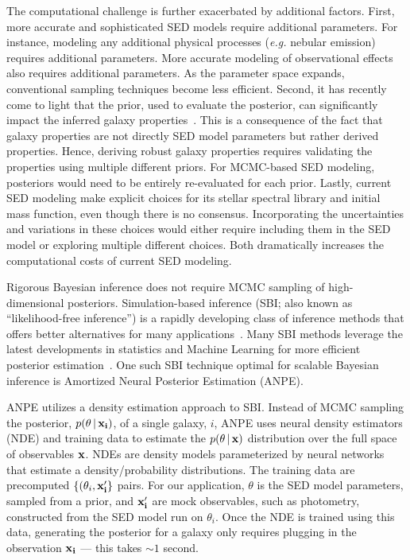 The computational challenge is further exacerbated by additional factors. 
First, more accurate and sophisticated SED models require additional
parameters. 
For instance, modeling any additional physical processes (\emph{e.g.} nebular
emission) requires additional parameters. 
More accurate modeling of observational effects also requires additional
parameters. 
As the parameter space expands, conventional sampling techniques become less
efficient. 
Second, it has recently come to light that the prior, used to evaluate the
posterior, can significantly impact the inferred galaxy
properties~\citep{carnall2017, leja2017, hahn2022}. 
This is a consequence of the fact that galaxy properties are not directly SED
model parameters but rather derived properties.
Hence, deriving robust galaxy properties requires validating the properties
using multiple different priors. 
For MCMC-based SED modeling, posteriors would need to be entirely re-evaluated
for each prior.
Lastly, current SED modeling make explicit choices for its stellar spectral
library and initial mass function, even though there is no consensus. 
Incorporating the uncertainties and variations in these choices would either
require including them in the SED model or exploring multiple different choices.
Both dramatically increases the computational costs of current SED modeling.  

Rigorous Bayesian inference does not require MCMC sampling of high-dimensional
posteriors. 
Simulation-based inference (SBI; also known as ``likelihood-free inference'')
is a rapidly developing class of inference methods that offers better
alternatives for many applications~\citep[see][and reference
therein]{cranmer2020}.
Many SBI methods leverage the latest developments in statistics and Machine
Learning for more efficient posterior estimation~\citep{papamakarios2017,
alsing2019a, hahn2019c, dax2021, huppenkothen2021, zhang2021}. 
One such SBI technique optimal for scalable Bayesian inference is Amortized
Neural Posterior Estimation (ANPE). 

ANPE utilizes a density estimation approach to SBI. 
Instead of MCMC sampling the posterior, $p(\theta \,|\, \bf{x}_i)$, of a
single galaxy, $i$, ANPE uses neural density estimators (NDE) and training data
to estimate the $p(\theta\,|\,\bf{x})$ distribution over the full space of
observables ${\bf x}$.
NDEs are density models parameterized by neural networks that estimate a
density/probability distributions. 
The training data are precomputed $\{(\theta_i, \bf{x}'_i\}$ pairs.
For our application, $\theta$ is the SED model parameters, sampled from a 
prior, and $\bf{x}'_i$ are mock observables, such as photometry, constructed
from the SED model run on $\theta_i$. 
Once the NDE is trained using this data, generating the posterior for a galaxy
only requires plugging in the observation $\bf{x}_i$ --- this takes ${\sim}1$
second. 

